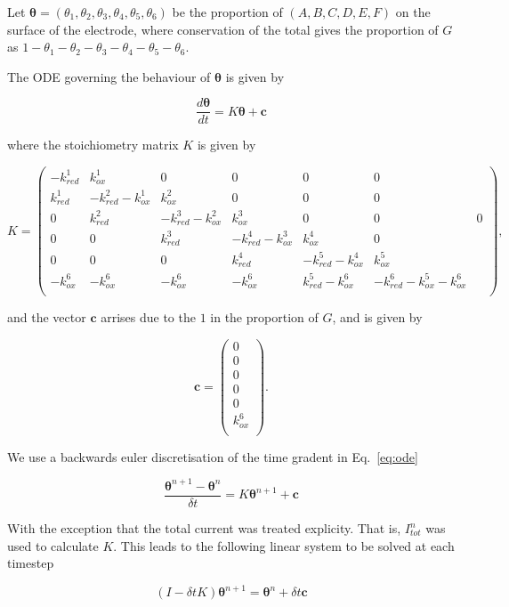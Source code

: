 \documentclass[a4paper, 12pt]{article}
\begin{document}
Let $\bm{\theta} = (\theta_1,\theta_2,\theta_3,\theta_4,\theta_5,\theta_6)$ be 
the proportion of $(A,B,C,D,E,F)$ on the surface of the electrode, where 
conservation of the total gives the proportion of $G$ as 
$1-\theta_1-\theta_2-\theta_3-\theta_4-\theta_5-\theta_6$. 

The ODE governing the behaviour of $\bm{\theta}$ is given by

$$
\label{eq:ode}
\frac{d\bm{\theta}}{dt} = K \bm{\theta} + \mathbf{c}
$$

where the stoichiometry matrix $K$ is given by

$$
K = \begin{pmatrix}
    - k^1_{red} & k^1_{ox} & 0 & 0 & 0 & 0 \\
      k^1_{red} & -k^2_{red}-k^1_{ox} & k^2_{ox} & 0 & 0 & 0 \\
      0 & k^2_{red} & -k^3_{red}-k^2_{ox} & k^3_{ox} & 0 & 0 & 0 \\
      0 & 0 & k^3_{red} & -k^4_{red}-k^3_{ox} &  k^4_{ox} & 0 \\
      0 & 0 & 0 & k^4_{red} & -k^5_{red}-k^4_{ox} & k^5_{ox} \\
      -k^6_{ox} & -k^6_{ox} & -k^6_{ox} & -k^6_{ox} & k^5_{red} -k^6_{ox}& 
      -k^6_{red}-k^5_{ox} -k^6_{ox}\\
\end{pmatrix},
$$

and the vector $\mathbf{c}$ arrises due to the $1$ in the proportion of $G$, and 
is given by

$$
\mathbf{c} = \begin{pmatrix}
    0 \\
    0 \\
    0 \\
    0 \\
    0 \\
    k^6_{ox} \\
\end{pmatrix}.
$$

We use a backwards euler discretisation of the time gradent in Eq.~\ref{eq:ode}

$$
\frac{\bm{\theta}^{n+1} - \bm{\theta}^{n}}{\delta t} = K \bm{\theta}^{n+1} +
\mathbf{c}
$$

With the exception that the total current was treated explicity. That is, 
$I_{tot}^n$ was used to calculate $K$. This leads to the following linear system 
to be solved at each timestep

$$
(I - \delta t K)\bm{\theta}^{n+1} = \bm{\theta}^n + \delta t \mathbf{c}
$$
\end{document}
